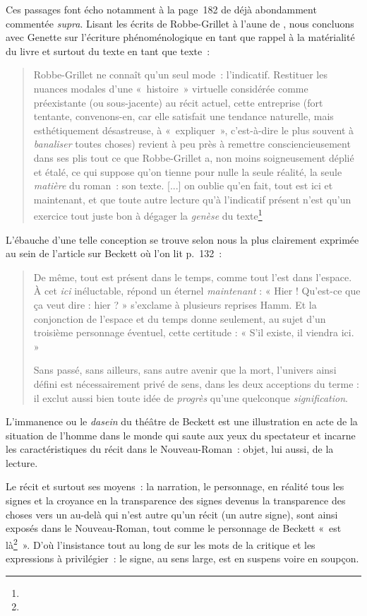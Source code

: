 Ces passages font écho notamment à la page~182 de \punr{} déjà abondamment commentée \textit{supra}.
Lisant les écrits de Robbe-Grillet à l'aune de \punr{}, nous concluons avec Genette sur l'écriture phénoménologique en tant que rappel à la matérialité du livre et surtout du texte en tant que texte~: 
\begin{quote}
    Robbe-Grillet ne connaît qu'un seul mode~: l'indicatif. Restituer les nuances modales d'une «~histoire~» virtuelle considérée comme préexistante (ou sous-jacente) au récit actuel, cette entreprise (fort tentante, convenons-en, car elle satisfait une tendance naturelle, mais esthétiquement désastreuse, à «~expliquer~», c'est-à-dire le plus souvent à \textit{banaliser} toutes choses) revient à peu près à remettre consciencieusement dans ses plis tout ce que Robbe-Grillet a, non moins soigneusement déplié et étalé, ce qui suppose qu'on tienne pour nulle la seule réalité, la seule \textit{matière} du roman~: son texte. [...] on oublie qu'en fait, tout est ici et maintenant, et que toute autre lecture qu'à l'indicatif présent n'est qu'un exercice tout juste bon à dégager la \textit{genèse} du texte\footnote{}
\end{quote}
L'ébauche d'une telle conception se trouve selon nous la plus clairement exprimée au sein de l'article sur Beckett où l'on lit p.~132~:
\begin{quote}
    De même, tout est présent dans le temps, comme tout l’est dans l’espace. À cet \textit{ici} inéluctable, répond un éternel \textit{maintenant} : « Hier ! Qu’est-ce que ça veut dire : hier ? » s’exclame à plusieurs reprises Hamm. Et la conjonction de l’espace et du temps donne seulement, au sujet d’un troisième personnage éventuel, cette certitude : « S’il existe, il viendra ici. »

    Sans passé, sans ailleurs, sans autre avenir que la mort, l’univers ainsi défini est nécessairement privé de sens, dans les deux acceptions du terme : il exclut aussi bien toute idée de \textit{progrès} qu’une quelconque \textit{signification}.
\end{quote}
L'immanence ou le \textit{dasein} du théâtre de Beckett est une illustration en acte de la situation de l'homme dans le monde qui saute aux yeux du spectateur et incarne les caractéristiques du récit dans le Nouveau-Roman~: objet, lui aussi, de la lecture.

Le récit et surtout ses moyens~: la narration, le personnage, en réalité tous les signes et la croyance en la transparence des signes devenus la transparence des choses vers un au-delà qui n'est autre qu'un récit (un autre signe), sont ainsi exposés dans le Nouveau-Roman, tout comme le personnage de Beckett «~est là\footnote{}~». D'où l'insistance tout au long de \punr{} sur les mots de la critique et les expressions à privilégier~: le signe, au sens large, est en suspens voire en soupçon.

